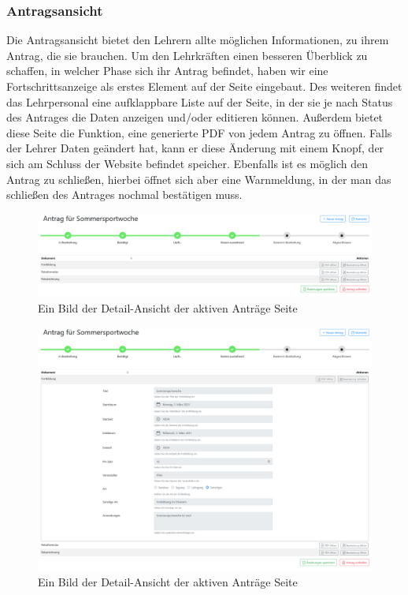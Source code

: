 \subsubsection{Antragsansicht}
Die Antragsansicht bietet den Lehrern allte möglichen Informationen, zu ihrem Antrag, die sie brauchen. Um den Lehrkräften einen besseren Überblick zu schaffen, in welcher Phase sich ihr Antrag befindet, haben wir eine Fortschrittsanzeige als erstes Element auf der Seite eingebaut. Des weiteren findet das Lehrpersonal eine aufklappbare Liste auf der Seite, in der sie je nach Status des Antrages die Daten anzeigen und/oder editieren können. Außerdem bietet diese Seite die Funktion, eine generierte PDF von jedem Antrag zu öffnen. Falls der Lehrer Daten geändert hat, kann er diese Änderung mit einem Knopf, der sich am Schluss der Website befindet speicher. Ebenfalls ist es möglich den Antrag zu schließen, hierbei öffnet sich aber eine Warnmeldung, in der man das schließen des Antrages nochmal bestätigen muss.
\begin{figure}[H]
	\centering
	\includegraphics[width=1\linewidth]{images/website/antrag_zu}
	\caption[Aktiv]{Ein Bild der Detail-Ansicht der aktiven Anträge Seite}
	\label{fig:antragaktivdetail}
\end{figure}
\begin{figure}[H]
	\centering
	\includegraphics[width=1\linewidth]{images/website/antrag}
	\caption[Aktiv]{Ein Bild der Detail-Ansicht der aktiven Anträge Seite}
	\label{fig:antragaktivdetail}
\end{figure}
